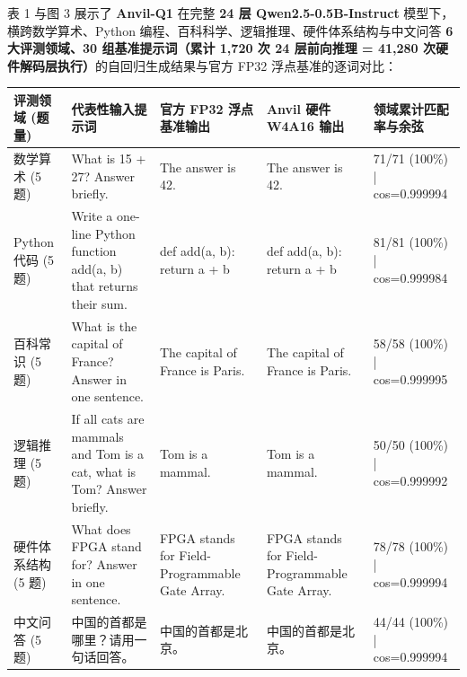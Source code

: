 \documentclass[11pt,a4paper]{article}
\begin{document}
表 1 与图 3 展示了 \textbf{Anvil-Q1} 在完整 \textbf{24 层 Qwen2.5-0.5B-Instruct} 模型下，横跨数学算术、Python 编程、百科科学、逻辑推理、硬件体系结构与中文问答 \textbf{6 大评测领域、30 组基准提示词（累计 1,720 次 24 层前向推理 = 41,280 次硬件解码层执行）}的自回归生成结果与官方 FP32 浮点基准的逐词对比：

{\footnotesize\renewcommand{\arraystretch}{1.14}\begin{longtable}{@{}L{0.15\textwidth}L{0.2\textwidth}L{0.19\textwidth}L{0.19\textwidth}L{0.17\textwidth}@{}}\toprule

\textbf{评测领域 (\allowbreak{}题量)\allowbreak{}} & \textbf{代表性输入提示词} & \textbf{官方 FP32 浮点基准输出} & \textbf{Anvil 硬件 W4A16 输出} & \textbf{领域累计匹配率与余弦}\\\midrule\endhead

数学算术 (\allowbreak{}5 题)\allowbreak{} & What is 15 +\allowbreak{} 27? Answer briefly. & The answer is 42. & The answer is 42. & 71/\allowbreak{}71 (\allowbreak{}100\%)\allowbreak{} | cos=\allowbreak{}0.999994\\[2pt]

Python代码 (\allowbreak{}5 题)\allowbreak{} & Write a one-line Python function add(\allowbreak{}a,\allowbreak{} b)\allowbreak{} that returns their sum. & def add(\allowbreak{}a,\allowbreak{} b)\allowbreak{}:     return a +\allowbreak{} b & def add(\allowbreak{}a,\allowbreak{} b)\allowbreak{}:     return a +\allowbreak{} b & 81/\allowbreak{}81 (\allowbreak{}100\%)\allowbreak{} | cos=\allowbreak{}0.999984\\[2pt]

百科常识 (\allowbreak{}5 题)\allowbreak{} & What is the capital of France? Answer in one sentence. & The capital of France is Paris. & The capital of France is Paris. & 58/\allowbreak{}58 (\allowbreak{}100\%)\allowbreak{} | cos=\allowbreak{}0.999995\\[2pt]

逻辑推理 (\allowbreak{}5 题)\allowbreak{} & If all cats are mammals and Tom is a cat,\allowbreak{} what is Tom? Answer briefly. & Tom is a mammal. & Tom is a mammal. & 50/\allowbreak{}50 (\allowbreak{}100\%)\allowbreak{} | cos=\allowbreak{}0.999992\\[2pt]

硬件体系结构 (\allowbreak{}5 题)\allowbreak{} & What does FPGA stand for? Answer in one sentence. & FPGA stands for Field-Programmable Gate Array. & FPGA stands for Field-Programmable Gate Array. & 78/\allowbreak{}78 (\allowbreak{}100\%)\allowbreak{} | cos=\allowbreak{}0.999994\\[2pt]

中文问答 (\allowbreak{}5 题)\allowbreak{} & 中国的首都是哪里？请用一句话回答。 & 中国的首都是北京。 & 中国的首都是北京。 & 44/\allowbreak{}44 (\allowbreak{}100\%)\allowbreak{} | cos=\allowbreak{}0.999994\\[2pt]

\bottomrule\end{longtable}}
\end{document}
